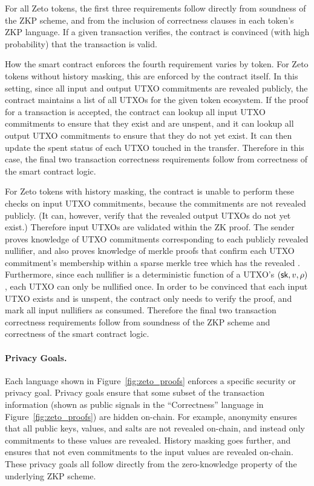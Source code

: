 For all Zeto tokens, the first three requirements follow directly from soundness of the ZKP scheme, and from the inclusion of correctness clauses in each token's ZKP language. If a given transaction verifies, the contract is convinced (with high probability) that the transaction is valid.

How the smart contract enforces the fourth requirement varies by token. For Zeto tokens without history masking, this are enforced by the contract itself. In this setting, since all input and output UTXO commitments are revealed publicly, the contract maintains a list of all UTXOs for the given token ecosystem. If the proof for a transaction is accepted, the contract can lookup all input UTXO commitments to ensure that they exist and are unspent, and it can lookup all output UTXO commitments to ensure that they do not yet exist. It can then update the spent status of each UTXO touched in the transfer. Therefore in this case, the final two transaction correctness requirements follow from correctness of the smart contract logic.

For Zeto tokens with history masking, the contract is unable to perform these checks on input UTXO commitments, because the commitments are not revealed publicly. (It can, however, verify that the revealed output UTXOs do not yet exist.) Therefore input UTXOs are validated within the ZK proof. The sender proves knowledge of UTXO commitments corresponding to each publicly revealed nullifier, and also proves knowledge of merkle proofs that confirm each UTXO commitment's membership within a sparse merkle tree which has the revealed . Furthermore, since each nullifier is a deterministic function of a UTXO's $(\mathsf{sk}, v, \rho)$, each UTXO can only be nullified once. In order to be convinced that each input UTXO exists and is unspent, the contract only needs to verify the proof, and mark all input nullifiers as consumed. Therefore the final two transaction correctness requirements follow from soundness of the ZKP scheme and correctness of the smart contract logic.

\paragraph{Privacy Goals.} %
Each language shown in Figure~\ref{fig:zeto_proofs} enforces a specific security or privacy goal. Privacy goals ensure that some subset of the transaction information (shown as public signals in the ``Correctness'' language in Figure~\ref{fig:zeto_proofs}) are hidden on-chain. For example, anonymity ensures that all public keys, values, and salts are not revealed on-chain, and instead only commitments to these values are revealed. History masking goes further, and ensures that not even commitments to the input values are revealed on-chain. These privacy goals all follow directly from the zero-knowledge property of the underlying ZKP scheme.

